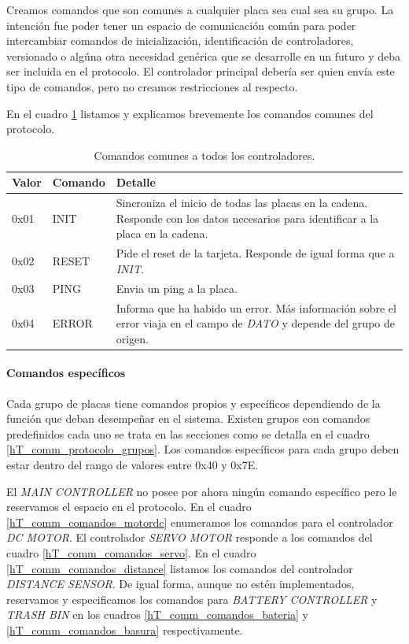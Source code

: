 Creamos comandos que son comunes a cualquier placa sea cual sea su grupo.
La intenci\'on fue poder tener un espacio de comunicaci\'on com\'un para poder intercambiar comandos
de inicializaci\'on, identificaci\'on de controladores, versionado o alg\'una otra necesidad gen\'erica que
se desarrolle en un futuro y deba ser incluida en el protocolo.
El controlador principal deber\'ia ser quien env\'ia este tipo de comandos, pero no creamos restricciones al respecto.

En el cuadro \ref{hT_comm_comandos_comunes} listamos y explicamos brevemente los comandos comunes del protocolo.

\begin{table}[h]
	\begin{center}
		\begin{tabular}{|l|l|p{8.5cm}|}
		\hline
		Valor & Comando & Detalle \\
		\hline
		0x01 & INIT & Sincroniza el inicio de todas las placas en la cadena.
		Responde con los datos necesarios para identificar a la placa en la cadena. \\
		\hline
		0x02 & RESET & Pide el reset de la tarjeta.
		Responde de igual forma que a \emph{INIT}. \\
		\hline
		0x03 & PING & Envia un ping a la placa.\\
		\hline
		0x04 & ERROR & Informa que ha habido un error.
		M\'as informaci\'on sobre el error viaja en el campo de \emph{DATO} y
		depende del grupo de origen. \\
		\hline
		\end{tabular}
		\caption{Comandos comunes a todos los controladores. }
		\label{hT_comm_comandos_comunes}
	\end{center}
\end{table}

\paragraph{Comandos espec\'ificos}
\label{h_comm_protocolo_comandosEspecificos}

Cada grupo de placas tiene comandos propios y espec\'ificos dependiendo de la funci\'on que deban desempe\~nar en el sistema.
Existen grupos con comandos predefinidos cada uno se trata en las secciones como se detalla en el cuadro \ref{hT_comm_protocolo_grupos}.
Los comandos espec\'ificos para cada grupo deben estar dentro del rango de valores entre 0x40 y 0x7E.

El \emph{MAIN CONTROLLER} no posee por ahora ning\'un comando espec\'ifico pero le reservamos el espacio en el protocolo.
En el cuadro \ref{hT_comm_comandos_motordc} enumeramos los comandos para el controlador \emph{DC MOTOR}.
El controlador \emph{SERVO MOTOR} responde a los comandos del cuadro \ref{hT_comm_comandos_servo}.
En el cuadro \ref{hT_comm_comandos_distance} listamos los comandos del controlador \emph{DISTANCE SENSOR}.
De igual forma, aunque no est\'en implementados, reservamos y especificamos los comandos para \emph{BATTERY CONTROLLER} y
\emph{TRASH BIN} en los cuadros \ref{hT_comm_comandos_bateria} y \ref{hT_comm_comandos_basura} respectivamente.

